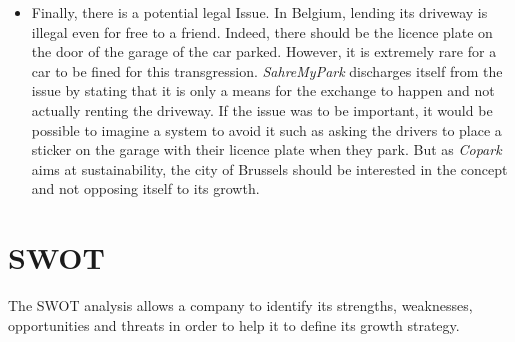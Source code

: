 \documentclass[12pt,a4paper,oneside]{book}
\newcommand{\bp}{\textit{Copark}}
\begin{document}
\begin{itemize}
\item Finally, there is a potential legal Issue. In Belgium, lending its driveway is illegal even for free to a friend. Indeed, there should be the licence plate on the door of the garage of the car parked. However, it is extremely rare for a car to be fined for this transgression. \textit{SahreMyPark} discharges itself from the issue by stating that it is only a means for the exchange to happen and not actually renting the driveway. If the issue was to be important, it would be possible to imagine a system to avoid it such as asking the drivers to place a sticker on the garage with their licence plate when they park. But as \bp{} aims at sustainability, the city of Brussels should be interested in the concept and not opposing itself to its growth.

\end{itemize}


\section{SWOT}
The SWOT analysis allows a company to identify its strengths, weaknesses, opportunities and threats in order to help it to define its growth strategy.
\end{document}
